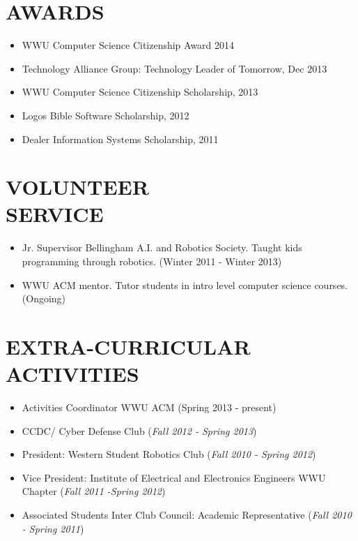 \documentclass[line,margin]{res}
\begin{document}
\begin{resume}
\section{AWARDS}
	\begin{itemize} \itemsep -1pt
		\item WWU Computer Science Citizenship Award 2014
		\item Technology Alliance Group: Technology Leader of Tomorrow, Dec 2013
		\item WWU Computer Science Citizenship Scholarship, 2013
		\item Logos Bible Software Scholarship, 2012
		\item Dealer Information Systems Scholarship, 2011
	\end{itemize}
 
\section{VOLUNTEER \\ SERVICE}
		\begin{itemize} \itemsep -1pt
			\item Jr. Supervisor Bellingham A.I. and Robotics Society.  Taught kids programming through robotics. (Winter 2011 - Winter 2013)
			\item WWU ACM mentor.  Tutor students in intro level computer science courses.  (Ongoing)
		\end{itemize}

\section{EXTRA-CURRICULAR \\ ACTIVITIES} 
	\begin{itemize} \itemsep -1pt
	\item Activities Coordinator WWU ACM (Spring 2013 - present)
	\item CCDC/ Cyber Defense Club ({\sl Fall 2012 - Spring 2013})
	\item President: Western Student Robotics Club ({\sl Fall 2010 - Spring 2012})
 	\item Vice President: Institute of Electrical and Electronics Engineers WWU Chapter ({\sl Fall 2011 -Spring 2012})
	\item Associated Students Inter Club Council: Academic Representative ({\sl Fall 2010 - Spring 2011})
	\end{itemize}
\end{resume}
\end{document}
